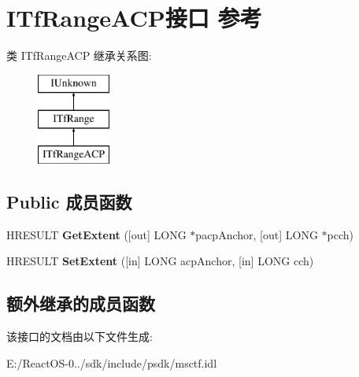 \hypertarget{interface_i_tf_range_a_c_p}{}\section{I\+Tf\+Range\+A\+C\+P接口 参考}
\label{interface_i_tf_range_a_c_p}
类 I\+Tf\+Range\+A\+CP 继承关系图\+:\begin{figure}[H]
\begin{center}
\leavevmode
\includegraphics[height=3.000000cm]{interface_i_tf_range_a_c_p}
\end{center}
\end{figure}
\subsection*{Public 成员函数}
\begin{DoxyCompactItemize}
\item 
\mbox{\label{interface_i_tf_range_a_c_p_a7043107a770840d419abb5e0980aadfb}} 
H\+R\+E\+S\+U\+LT {\bfseries Get\+Extent} (\mbox{[}out\mbox{]} L\+O\+NG $\ast$pacp\+Anchor, \mbox{[}out\mbox{]} L\+O\+NG $\ast$pcch)
\item 
\mbox{\label{interface_i_tf_range_a_c_p_a566cd0a22cb9836a4232a1f554cfa849}} 
H\+R\+E\+S\+U\+LT {\bfseries Set\+Extent} (\mbox{[}in\mbox{]} L\+O\+NG acp\+Anchor, \mbox{[}in\mbox{]} L\+O\+NG cch)
\end{DoxyCompactItemize}
\subsection*{额外继承的成员函数}


该接口的文档由以下文件生成\+:\begin{DoxyCompactItemize}
\item 
E\+:/\+React\+O\+S-\/0../sdk/include/psdk/msctf.\+idl\end{DoxyCompactItemize}
